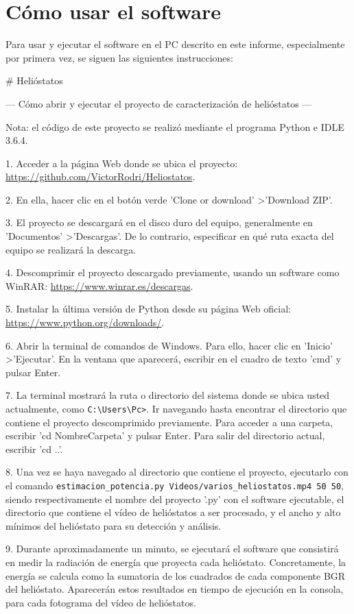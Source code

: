 \section{Cómo usar el software}

Para usar y ejecutar el software en el PC descrito en este informe, especialmente por primera vez, se siguen las siguientes instrucciones:

\# Helióstatos

--- Cómo abrir y ejecutar el proyecto de caracterización de helióstatos ---

Nota: el código de este proyecto se realizó mediante el programa Python e IDLE 3.6.4.

1. Acceder a la página Web donde se ubica el proyecto: \url{https://github.com/VictorRodri/Heliostatos}.

2. En ella, hacer clic en el botón verde 'Clone or download' \textgreater 'Download ZIP'.

3. El proyecto se descargará en el disco duro del equipo, generalmente en 'Documentos' \textgreater 'Descargas'. De lo contrario, especificar en qué ruta exacta del equipo se realizará la descarga.

4. Descomprimir el proyecto descargado previamente, usando un software como WinRAR: \url{https://www.winrar.es/descargas}.

5. Instalar la última versión de Python desde su página Web oficial: \url{https://www.python.org/downloads/}.

6. Abrir la terminal de comandos de Windows. Para ello, hacer clic en 'Inicio' \textgreater 'Ejecutar'. En la ventana que aparecerá, escribir en el cuadro de texto 'cmd' y pulsar Enter.

7. La terminal mostrará la ruta o directorio del sistema donde se ubica usted actualmente, como \verb|C:\Users\Pc>|. Ir navegando hasta encontrar el directorio que contiene el proyecto descomprimido previamente. Para acceder a una carpeta, escribir 'cd NombreCarpeta' y pulsar Enter. Para salir del directorio actual, escribir 'cd ..'.

8. Una vez se haya navegado al directorio que contiene el proyecto, ejecutarlo con el comando \verb|estimacion_potencia.py Videos/varios_heliostatos.mp4 50 50|, siendo respectivamente el nombre del proyecto '.py' con el software ejecutable, el directorio que contiene el vídeo de helióstatos a ser procesado, y el ancho y alto mínimos del helióstato para su detección y análisis.

9. Durante aproximadamente un minuto, se ejecutará el software que consistirá en medir la radiación de energía que proyecta cada helióstato. Concretamente, la energía se calcula como la sumatoria de los cuadrados de cada componente BGR del helióstato. Aparecerán estos resultados en tiempo de ejecución en la consola, para cada fotograma del vídeo de helióstatos.

